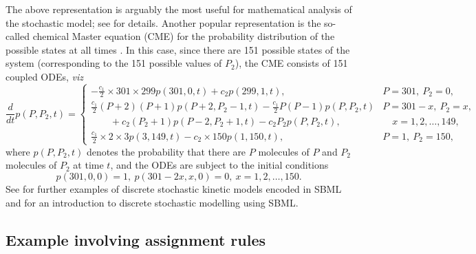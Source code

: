 The above representation is arguably the most useful for
mathematical analysis of the stochastic model; see \cite{ball:2006} for
details. Another popular representation is the so-called chemical
Master equation (CME) for the probability distribution of the possible
states at all times \citep{gillespie:1992}. In this case, since there are
151 possible states of the system (corresponding to the 151
possible values of $P_2$), the CME consists of 151 coupled
ODEs, \emph{viz}
\[
\frac{d}{dt}p(P,P_2,t) =
\left\{
\begin{array}{ll}
\displaystyle-\frac{c_1}{2}\times 301\times 299p(301,0,t)+c_2p(299,1,t),
&P=301,\ P_2=0,\\
\displaystyle\frac{c_1}{2}(P+2)(P+1)p(P+2,P_2-1,t)-\frac{c_1}{2}P(P-1)p(P,P_2,t)&P=301-x,\ P_2=x,\\
\qquad+c_2(P_2+1)p(P-2,P_2+1,t)-c_2P_2p(P,P_2,t),
&\quad x=1,2,\ldots,149,\\
\displaystyle\frac{c_1}{2}\times 2\times 3p(3,149,t)-c_2\times 150p(1,150,t),
&P=1,\ P_2=150,
\end{array}
\right.
\]
where $p(P,P_2,t)$ denotes the probability that there are $P$
molecules of $P$ and $P_2$ molecules of $P_2$ at time $t$, and the
ODEs are subject to the initial conditions
\[
p(301,0,0)=1,\ p(301-2x,x,0)=0,\ x=1,2,\ldots,150.
\]
See \cite{evans:2008} for further examples of discrete stochastic
kinetic models encoded in SBML and \cite{wilkinson_2006} for an
introduction to discrete stochastic modelling using SBML.



\subsection{Example involving assignment rules}
\label{apdx:rules-eg}

